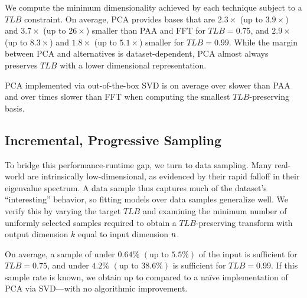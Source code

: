 We compute the minimum dimensionality achieved by each technique subject to a $TLB$ constraint. 
On average, PCA provides bases that are $2.3\times$ (up to $3.9\times$) and $3.7\times$ (up to $26\times$)  smaller than PAA and FFT for $TLB = 0.75$, and $2.9\times$ (up to $8.3\times$) and $1.8\times$ (up to $5.1\times$) smaller for $TLB = 0.99$.
While the margin between PCA and alternatives is dataset-dependent, PCA almost always preserves $TLB$ with a lower dimensional representation.

%

PCA implemented via out-of-the-box SVD is on average over  slower than PAA and over  times slower than FFT when computing the smallest $TLB$-preserving basis.


\subsection{Incremental, Progressive Sampling}
To bridge this performance-runtime gap, we turn to data sampling. 
Many real-world  are intrinsically low-dimensional, as evidenced by their rapid falloff in their eigenvalue spectrum.
A data sample thus captures much of the dataset's ``interesting'' behavior, so fitting models over data samples generalize well. 
We verify this by varying the target $TLB$ and examining the minimum number of uniformly selected samples required to obtain a $TLB$-preserving transform with output dimension $k$ equal to input dimension ${\color{black}n}$.

On average, a sample of under $0.64\%$ $(\text{up to } 5.5\%)$ of the input is sufficient for $TLB = 0.75$, and under $4.2\%$ $(\text{up to } 38.6\%)$ is sufficient for $TLB=0.99$.  
If this sample rate is known, we obtain up to  compared to a na\"ive implementation of PCA via SVD---with no algorithmic improvement. 


